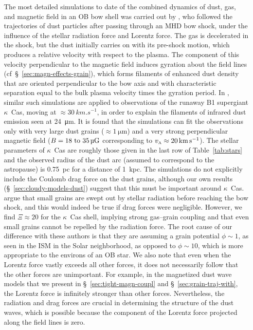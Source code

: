 The most detailed simulations to date of the combined dynamics of
dust, gas, and magnetic field in an OB bow shell was carried out by
\citet{Katushkina:2017a}, who followed the trajectories of dust
particles after passing through an MHD bow shock, under the influence
of the stellar radiation force and Lorentz force.  The gas is
decelerated in the shock, but the dust initially carries on with its
pre-shock motion, which produces a relative velocity with respect to
the plasma. The component of this velocity perpendicular to the
magnetic field induces gyration about the field lines
(cf~\S~\ref{sec:magn-effects-grain}), which forms filaments of
enhanced dust density that are oriented perpendicular to the bow axis
and with characteristic separation equal to the bulk plasma velocity
times the gyration period.  In \citet{Katushkina:2018a}, similar such
simulations are applied to observations of the runaway B1 supergiant
\(\kappa\)~Cas, moving at \(\approx \SI{30}{km.s^{-1}}\), in order to explain the
filaments of infrared dust emission seen at \SI{24}{\um}.  It is found
that the simulations can fit the observations only with very large
dust grains (\(\approx \SI{1}{\um}\)) and a very strong perpendicular
magnetic field (\(B = \text{\numrange{18}{35}} \, \si{\micro G}\)
corresponding to \(v_{\scriptscriptstyle\text{A}} \approx \SI{20}{km.s^{-1}}\)).  The stellar
parameters of \(\kappa\)~Cas are roughly those given in the last row of
Table~\ref{tab:stars} and the observed radius of the dust arc (assumed
to correspond to the astropause) is \SI{0.75}{pc} for a distance of
\SI{1}{kpc}.  The \citeauthor{Katushkina:2018a} simulations do not
explicitly include the Coulomb drag force on the dust grains, although
our own results (\S~\ref{sec:cloudy-models-dust}) suggest that this
must be important around \(\kappa\)~Cas.  \citet{Katushkina:2018a} argue
that small grains are swept out by stellar radiation before reaching
the bow shock, and this would indeed be true if drag forces were
negligible.  However, we find \(\Xi \approx 20\) for the
\(\kappa\)~Cas shell, implying strong gas--grain coupling and that even
small grains cannot be repelled by the radiation force.  The root
cause of our difference with these authors is that they are assuming a
grain potential \(\phi \sim 1\), as seen in the ISM in the Solar
neighborhood, as opposed to \(\phi \sim 10\), which is more appropriate to
the environs of an OB star.  We also note that even when the Lorentz
force vastly exceeds all other forces, it does not necessarily follow
that the other forces are unimportant.  For example, in the magnetized
dust wave models that we present in \S~\ref{sec:tight-magn-coupl} and
\S~\ref{sec:grain-traj-with}, the Lorentz force is infinitely stronger
than other forces.  Nevertheless, the radiation and drag forces are
crucial in determining the structure of the dust waves, which is
possible because the component of the Lorentz force projected along
the field lines is zero.


